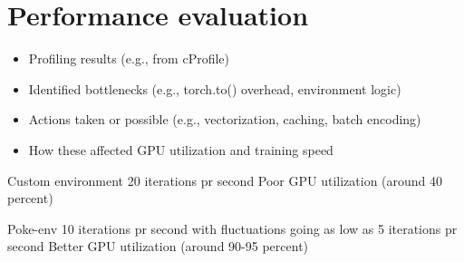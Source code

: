 \section{Performance evaluation}
\label{sec:performance-evaluation}


\begin{itemize}
    \item Profiling results (e.g., from cProfile)
    \item Identified bottlenecks (e.g., torch.to() overhead, environment logic)
    \item Actions taken or possible (e.g., vectorization, caching, batch encoding)
    \item How these affected GPU utilization and training speed
\end{itemize}

Custom environment 20 iterations pr second
Poor GPU utilization (around 40 percent)

Poke-env 10 iterations pr second with fluctuations going as low as 5 iterations pr second
Better GPU utilization (around 90-95 percent)
